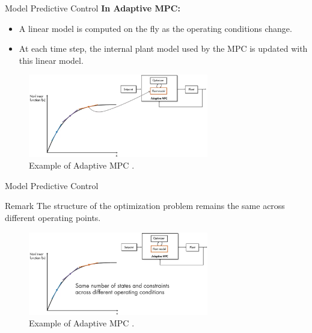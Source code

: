 \documentclass{thesisbeamer}
\begin{document}
\begin{frame}{Model Predictive Control} \vspace{4pt}
\textbf{In Adaptive MPC:}
\begin{itemize}
	\item A linear model is computed on the fly as the operating conditions change.
	\item At each time step, the internal plant model used by the MPC is updated with this linear model.
\end{itemize}

\begin{figure}
	\centering	\includegraphics[width=0.7\textwidth]{Images/Control/MPC_adaptive_a}
	\caption{Example of Adaptive MPC \cite{MathWorks_adaptive}.}
\end{figure}

\end{frame}

\begin{frame}{Model Predictive Control} \vspace{4pt}
\begin{alertblock}{Remark}
\vspace{0.5em}
The structure of the optimization problem remains the same across different operating points.
\vspace{0.5em}
\end{alertblock}

\begin{figure}
	\centering	\includegraphics[width=0.7\textwidth]{Images/Control/MPC_adaptive_b}
	\caption{Example of Adaptive MPC \cite{MathWorks_adaptive}.}
\end{figure}

\end{frame}
\end{document}
